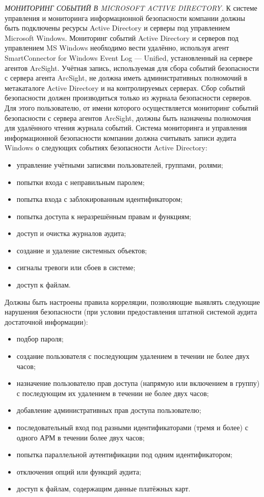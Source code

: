 \textit{МОНИТОРИНГ СОБЫТИЙ В MICROSOFT ACTIVE DIRECTORY.}
К системе управления и мониторинга информационной безопасности компании должны быть подключены ресурсы Active Directory и серверы под управлением Microsoft Windows. Мониторинг событий Active Directory и серверов под управлением MS Windows необходимо вести удалённо, используя агент SmartConnector for Windows Event Log --- Unified, установленный на сервере агентов ArcSight.
Учётная запись, используемая для сбора событий безопасности с сервера агента ArcSight, не должна иметь административных полномочий в метакаталоге Active Directory и на контролируемых серверах.
Сбор событий безопасности должен производиться только из журнала безопасности серверов. Для этого пользователю, от имени которого осуществляется мониторинг событий безопасности с сервера агентов ArcSight, должны быть назначены полномочия для удалённого чтения журнала событий.
Система мониторинга и управления информационной безопасности компании должна считывать записи аудита Windows о следующих событиях безопасности Active Directory:
\begin{itemize}
    \item управление учётными записями пользователей, группами, ролями;
    \item попытки входа с неправильным паролем;
    \item попытка входа с заблокированным идентификатором;
    \item попытка доступа к неразрешённым правам и функциям;
    \item доступ и очистка журналов аудита;
    \item создание и удаление системных объектов;
    \item сигналы тревоги или сбоев в системе;
    \item доступ к файлам.
\end{itemize}

Должны быть настроены правила корреляции, позволяющие выявлять следующие нарушения безопасности (при условии предоставления штатной системой аудита достаточной информации):
\begin{itemize}
    \item подбор пароля;
    \item создание пользователя с последующим удалением в течении не более двух часов;
    \item назначение пользователю прав доступа (напрямую или включением в группу) с последующим их удалением в течении не более двух часов;
    \item добавление административных прав доступа пользователю;
    \item последовательный вход под разными идентификаторами (тремя и более) с одного АРМ в течении более двух часов;
    \item попытка параллельной аутентификации под одним идентификатором;
    \item отключения опций или функций аудита;
    \item доступ к файлам, содержащим данные платёжных карт.
\end{itemize}

